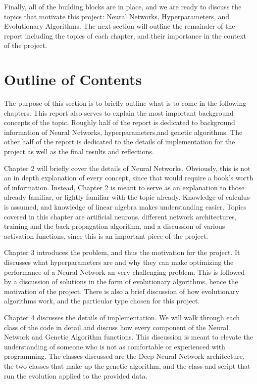 \documentclass[12pt]{report}
\begin{document}
Finally, all of the building blocks are in place, and we are ready to discuss the topics that motivate this project: Neural Networks, Hyperparameters, and Evolutionary Algorithms. The next section will outline the remainder of the report including the topics of each chapter, and their importance in the context of the project.

\section{Outline of Contents}
The purpose of this section is to briefly outline what is to come in the following chapters. This report also serves to explain the most important background concepts of the topic. Roughly half of the report is dedicated to background information of Neural Networks, hyperparameters,and genetic algorithms. The other half of the report is dedicated to the details of implementation for the project as well as the final results and reflections.

Chapter 2 will briefly cover the details of Neural Networks. Obviously, this is not an in depth explanation of every concept, since that would require a book's worth of information. Instead, Chapter 2 is meant to serve as an explanation to those already familiar, or lightly familiar with the topic already. Knowledge of calculus is assumed, and knowledge of linear algebra makes understanding easier. Topics covered in this chapter are artificial neurons, different network architectures, training and the back propagation algorithm, and a discussion of various activation functions, since this is an important piece of the project.

Chapter 3 introduces the problem, and thus the motivation for the project. It discusses what hyperparameters are and why they can make optimizing the performance of a Neural Network an very challenging problem. This is followed by a discussion of solutions in the form of evolutionary algorithms, hence the motivation of the project. There is also a brief discussion of how evolutionary algorithms work, and the particular type chosen for this project.

Chapter 4 discusses the details of implementation. We will walk through each class of the code in detail and discuss how every component of the Neural Network and Genetic Algorithm functions. This discussion is meant to elevate the understanding of someone who is not as comfortable or experienced with programming. The classes discussed are the Deep Neural Network architecture, the two classes that make up the genetic algorithm, and the class and script that run the evolution applied to the provided data.
\end{document}
